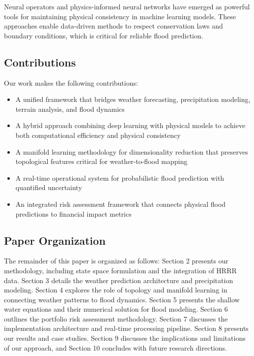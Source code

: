 \documentclass{article}
\begin{document}
Neural operators \cite{li2020} and physics-informed neural networks \cite{raissi2019} have emerged as powerful tools for maintaining physical consistency in machine learning models. These approaches enable data-driven methods to respect conservation laws and boundary conditions, which is critical for reliable flood prediction.

\subsection{Contributions}
Our work makes the following contributions:

\begin{itemize}
    \item A unified framework that bridges weather forecasting, precipitation modeling, terrain analysis, and flood dynamics
    \item A hybrid approach combining deep learning with physical models to achieve both computational efficiency and physical consistency
    \item A manifold learning methodology for dimensionality reduction that preserves topological features critical for weather-to-flood mapping
    \item A real-time operational system for probabilistic flood prediction with quantified uncertainty
    \item An integrated risk assessment framework that connects physical flood predictions to financial impact metrics
\end{itemize}

\subsection{Paper Organization}
The remainder of this paper is organized as follows: Section 2 presents our methodology, including state space formulation and the integration of HRRR data. Section 3 details the weather prediction architecture and precipitation modeling. Section 4 explores the role of topology and manifold learning in connecting weather patterns to flood dynamics. Section 5 presents the shallow water equations and their numerical solution for flood modeling. Section 6 outlines the portfolio risk assessment methodology. Section 7 discusses the implementation architecture and real-time processing pipeline. Section 8 presents our results and case studies. Section 9 discusses the implications and limitations of our approach, and Section 10 concludes with future research directions.
\end{document}

